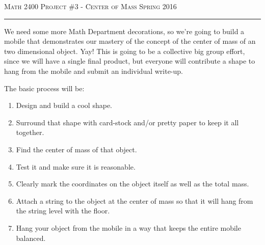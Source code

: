 \documentclass[12pt]{amsart}
\begin{document}
\thispagestyle{empty}

{\scshape Math 2400} \hfill {\scshape \large Project \#3 - Center of Mass} \hfill {\scshape Spring 2016}
 
\smallskip

\hrule

\bigskip

We need some more Math Department decorations, so we're going to build a mobile that demonstrates our mastery of the concept of the center of mass of an two dimensional object.  Yay!  This is going to be a collective big group effort, since we will have a single final product, but everyone will contribute a shape to hang from the mobile and submit an individual write-up.

\bigskip

\bigskip

The basic process will be:

\begin{enumerate}

\item  Design and build a cool shape.

\medskip

\item  Surround that shape with card-stock and/or pretty paper to keep it all together.

\medskip

\item  Find the center of mass of that object.

\medskip

\item  Test it and make sure it is reasonable.

\medskip

\item  Clearly mark the coordinates on the object itself as well as the total mass.

\medskip

\item  Attach a string to the object at the center of mass so that it will hang from the string level with the floor.

\medskip

\item  Hang your object from the mobile in a way that keeps the entire mobile balanced.

\medskip

\end{enumerate}

\bigskip
\end{document}
